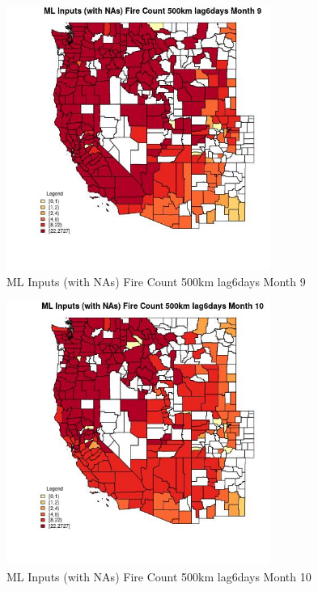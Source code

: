 \begin{figure} 
\centering  
\includegraphics[width=0.77\textwidth]{Code_Outputs/Report_ML_input_PM25_Step4_part_f_de_duplicated_aveswNAs_CountyFire_Count_500km_lag6daysmedianMonth9.jpg} 
\caption{\label{fig:Report_ML_input_PM25_Step4_part_f_de_duplicated_aveswNAsCountyFire_Count_500km_lag6daysmedianMonth9}ML Inputs (with NAs) Fire Count 500km lag6days Month 9} 
\end{figure} 
 

\begin{figure} 
\centering  
\includegraphics[width=0.77\textwidth]{Code_Outputs/Report_ML_input_PM25_Step4_part_f_de_duplicated_aveswNAs_CountyFire_Count_500km_lag6daysmedianMonth10.jpg} 
\caption{\label{fig:Report_ML_input_PM25_Step4_part_f_de_duplicated_aveswNAsCountyFire_Count_500km_lag6daysmedianMonth10}ML Inputs (with NAs) Fire Count 500km lag6days Month 10} 
\end{figure} 
 

